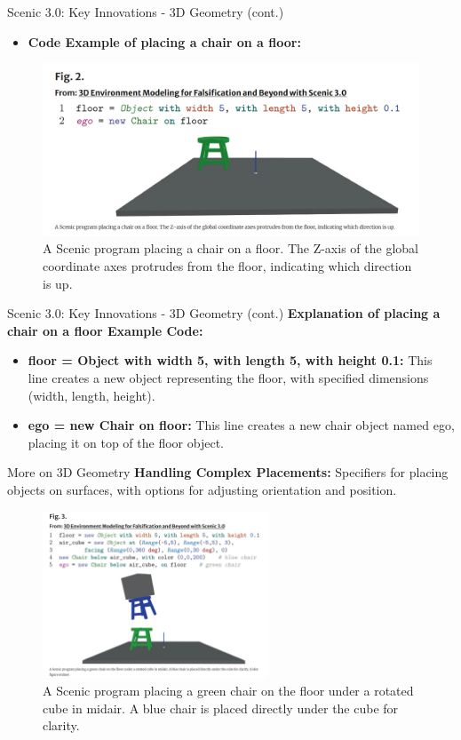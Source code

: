 \documentclass{beamer}
\begin{document}
\begin{frame}{Scenic 3.0: Key Innovations - 3D Geometry (cont.)}
  \begin{itemize}
  \setlength{\itemindent}{-1em} 
    \item \textbf{Code Example of placing a chair on a floor:}
  \end{itemize}
\begin{figure}
\centering
\includegraphics[width=0.7\linewidth]{FIG2.png}
\caption{A Scenic program placing a chair on a floor. The Z-axis of the global coordinate axes protrudes from the floor, indicating which direction is up.}
\label{fig:chair-on-floor}
\end{figure}
\end{frame}

\begin{frame}{Scenic 3.0: Key Innovations - 3D Geometry (cont.)}
    \textbf{Explanation of placing a chair on a floor Example Code:}\\
    \begin{itemize}
        \setlength{\itemindent}{-1em} 
        \item \textbf{floor = Object with width 5, with length 5, with height 0.1:} This line creates a new object representing the floor, with specified dimensions (width, length, height).
        \item \textbf{ego = new Chair on floor: }This line creates a new chair object named ego, placing it on top of the floor object.
    \end{itemize}
\end{frame}

\begin{frame}{More on 3D Geometry}
    \textbf{Handling Complex Placements:} Specifiers for placing objects on surfaces, with options for adjusting orientation and position.
    \begin{figure}
        \centering
        \includegraphics[width=0.6\textwidth]{FIG3.png}
        \caption{A Scenic program placing a green chair on the floor under a rotated cube in midair. A blue chair is placed directly under the cube for clarity.}
        \label{fig:complex-placements}
    \end{figure}
\end{frame}
\end{document}
